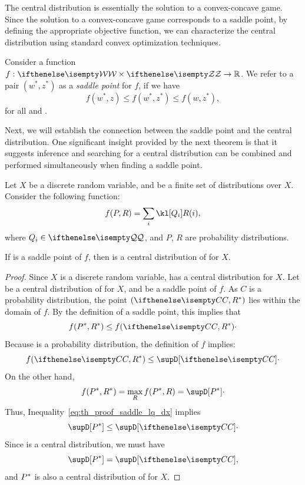 The central distribution is essentially the solution to a convex-concave game.
Since the solution to a convex-concave game corresponds to a saddle point,
by defining the appropriate objective function, we can characterize the central
distribution using standard convex optimization techniques.

\begin{definition} 
    Consider a function $f:\set{w} \times \set{z} \to \field{R}$.
    We refer to a pair $(w^*, z^*)$ as a \emph{saddle point} for $f$, if we have
    \[
        f(w^*, z) \leq f(w^*, z^*) \leq f(w, z^*),
    \]
    for all  and .
\end{definition}

Next, we will establish the connection between the saddle point and the central distribution.
One significant insight provided by the next theorem is that it suggests inference and searching for a central
distribution can be combined and performed simultaneously when finding a saddle point.

\begin{theorem}
    \label{th:saddle_is_central}
    Let $X$ be a discrete random variable, and \setQ be a finite set of distributions over $X$.
    Consider the following function:
    \begin{equation*}
        f(P, R)= \sum_i \kl[Q_i] R(i),
    \end{equation*}
    where $Q_i \in \setQ$, and $P$, $R$ are probability distributions.

    If \saddle is a saddle point of $f$, then \saddP is a central distribution of \setQ for $X$.
\end{theorem}

\begin{proof}
    Since $X$ is a discrete random variable, \setQ has a central distribution for $X$.
    Let \cDist be a central distribution of \setQ for $X$, and \saddle be a saddle point of $f$.
    As $C$ is a probability distribution, the point $(\cDist, \saddR)$ lies within the domain of $f$.
    By the definition of a saddle point, this implies that
    \begin{equation}
        \label{eq:th_proof_saddle_lq_dx}
        f\saddle \leq f(\cDist, \saddR) \cdot
    \end{equation}
    Because \saddR is a probability distribution, the definition of $f$ implies:
    \[
        f(\cDist, \saddR) \leq \supD[\cDist] \cdot
    \]
    On the other hand,
    \[
        f\saddle = \max_{R} f(\saddP, R) = \supD[\saddP] \cdot
    \]
    Thus, Inequality~\ref{eq:th_proof_saddle_lq_dx} implies
    \[
        \supD[\saddP] \leq \supD[\cDist] \cdot
    \]
    Since \cDist is a central distribution, we must have \[\supD[\saddP] = \supD[\cDist],\] and $P^{*}$ is also a
    central distribution of \setQ for $X$.
\end{proof}

